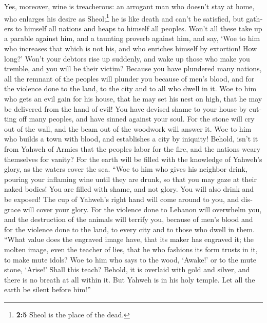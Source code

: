 \begin{paracol}{2}
\begin{otherlanguage}{english}
 Yes, moreover, wine is treacherous: an arrogant man who
doesn't stay at home, who enlarges his desire as Sheol;\footnote{\textbf{2:5}
  Sheol is the place of the dead.} he is like death and can't be
satisfied, but gathers to himself all nations and heaps to himself all
peoples.  Won't all these take up a parable against him,
and a taunting proverb against him, and say, `Woe to him who increases
that which is not his, and who enriches himself by extortion! How long?'
 Won't your debtors rise up suddenly, and wake up those
who make you tremble, and you will be their victim? 
Because you have plundered many nations, all the remnant of the peoples
will plunder you because of men's blood, and for the violence done to
the land, to the city and to all who dwell in it.  Woe to
him who gets an evil gain for his house, that he may set his nest on
high, that he may be delivered from the hand of evil! 
You have devised shame to your house by cutting off many peoples, and
have sinned against your soul.  For the stone will cry
out of the wall, and the beam out of the woodwork will answer it.
 Woe to him who builds a town with blood, and establishes
a city by iniquity!  Behold, isn't it from Yahweh of
Armies that the peoples labor for the fire, and the nations weary
themselves for vanity?  For the earth will be filled with
the knowledge of Yahweh's glory, as the waters cover the sea.
 ``Woe to him who gives his neighbor drink, pouring your
inflaming wine until they are drunk, so that you may gaze at their naked
bodies!  You are filled with shame, and not glory. You
will also drink and be exposed! The cup of Yahweh's right hand will come
around to you, and disgrace will cover your glory.  For
the violence done to Lebanon will overwhelm you, and the destruction of
the animals will terrify you, because of men's blood and for the
violence done to the land, to every city and to those who dwell in them.
 ``What value does the engraved image have, that its
maker has engraved it; the molten image, even the teacher of lies, that
he who fashions its form trusts in it, to make mute idols?
 Woe to him who says to the wood, `Awake!' or to the mute
stone, `Arise!' Shall this teach? Behold, it is overlaid with gold and
silver, and there is no breath at all within it.  But
Yahweh is in his holy temple. Let all the earth be silent before him!''


\end{otherlanguage}
\end{paracol}
